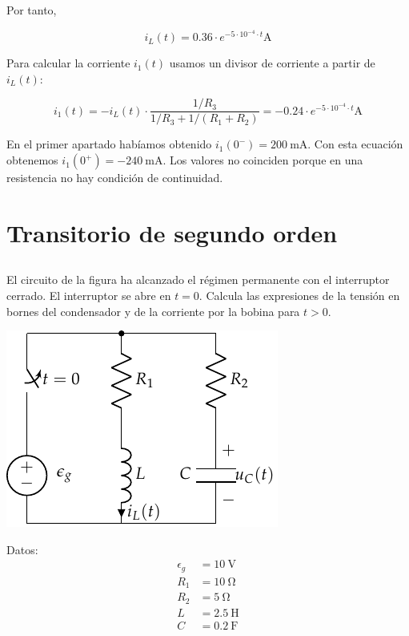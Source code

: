 \documentclass[12pt]{article}
\begin{document}
Por tanto,

\begin{equation*}
  i_L(t) = 0.36 \cdot e^{-5 \cdot 10^{-4} \cdot t}\si{\ampere}
\end{equation*}

Para calcular la corriente $i_1(t)$ usamos un divisor de corriente a partir de $i_L(t)$:

\begin{equation*}
  i_1(t) = -i_L(t) \cdot \frac{1/R_3}{1/R_3 + 1/(R_1 + R_2)} = -0.24 \cdot e^{-5 \cdot 10^{-4} \cdot t}\si{\ampere}
\end{equation*}

En el primer apartado habíamos obtenido $i_1(0^-) = \SI{200}{\milli\ampere}$. Con esta ecuación obtenemos $i_1(0^+) = -\SI{240}{\milli\ampere}$. Los valores no coinciden porque en una resistencia no hay condición de continuidad.

\clearpage

\section{Transitorio de segundo orden}

\subsection{}

El circuito de la figura ha alcanzado el régimen permanente con el interruptor cerrado. El interruptor se abre en $t = 0$. Calcula las expresiones de la tensión en bornes del condensador y de la corriente por la bobina para $t > 0$.

\vspace*{1cm}

\begin{minipage}{0.7\textwidth}
  \includegraphics[scale=0.95]{figs/FM_4_8}
\end{minipage}
\hfill
\begin{minipage}{0.3\textwidth}
Datos:
\begin{align*}
  \epsilon_g &= \SI{10}{\volt}\\
  R_1 &= \SI{10}{\ohm}\\
  R_2 &= \SI{5}{\ohm}\\
  L &= \SI{2.5}{\henry}\\
  C &= \SI{0.2}{\farad}      
\end{align*}
\end{minipage}
\end{document}
